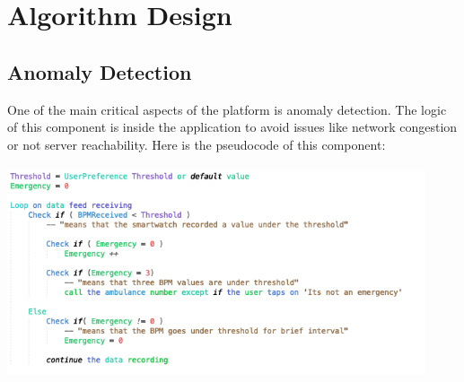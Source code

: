 \newpage
\section{Algorithm Design}

	\subsection{Anomaly Detection}
	One of the main critical aspects of the platform is anomaly detection. The logic of this component is inside the application to avoid issues like network congestion or not server reachability. \newline
		Here is the pseudocode of this component:
		\\\\
		\centering
		\includegraphics[height=6.00cm,keepaspectratio]{Figures/EmercencyPseudoCode}